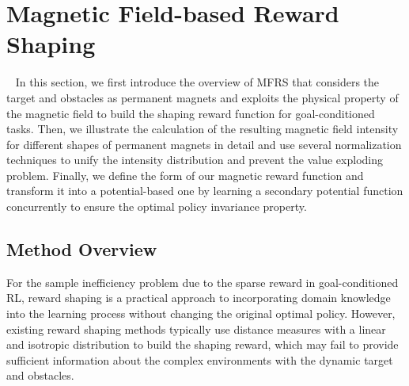 \documentclass[journal]{IEEEtran}
\begin{document}
\section{Magnetic Field-based Reward Shaping}~\label{method}
In this section, we first introduce the overview of MFRS that considers the target and obstacles as permanent magnets and exploits the physical property of the magnetic field to build the shaping reward function for goal-conditioned tasks.
Then, we illustrate the calculation of the resulting magnetic field intensity for different shapes of permanent magnets in detail
and use several normalization techniques to unify the intensity distribution and prevent the value exploding problem.
Finally, we define the form of our magnetic reward function and transform it into a potential-based one by learning a secondary potential function concurrently to ensure the optimal policy invariance property.


\subsection{Method Overview}\label{overview}
For the sample inefficiency problem due to the sparse reward in goal-conditioned RL, reward shaping is a practical approach to incorporating domain knowledge into the learning process without changing the original optimal policy.
However, existing reward shaping methods typically use distance measures with a linear and isotropic distribution to build the shaping reward, which may fail to provide sufficient information about the complex environments with the dynamic target and obstacles.
\end{document}
